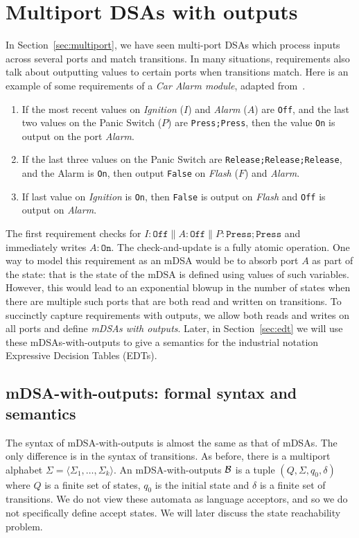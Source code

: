 \section{Multiport DSAs with outputs}
\label{sec:multiport-outputs}

In Section~\ref{sec:multiport}, we have seen multi-port DSAs which process inputs across several ports and match transitions. In many situations, requirements also talk about outputting values to certain ports when transitions match. Here is an example of some requirements of a \emph{Car Alarm module}, adapted from~\cite{DBLP:conf/enase/VenkateshSZA15a}. 
\begin{enumerate}
\item If the most recent values on \emph{Ignition} ($I$) and \emph{Alarm} ($A$) are \texttt{Off}, and the last two values on the Panic Switch ($P$) are \texttt{Press;Press}, then the value \texttt{On} is output on the port \emph{Alarm}.

\item If the last three values on the Panic Switch are \texttt{Release;Release;Release}, and the Alarm is \texttt{On}, then output \texttt{False} on \emph{Flash} ($F$)
and \emph{Alarm}.

\item If last value on \emph{Ignition} is \texttt{On}, then \texttt{False} is output on \emph{Flash} and \texttt{Off} is output on \emph{Alarm}.
\end{enumerate}

The first requirement checks for $I:\mathtt{Off} \parallel A:\mathtt{Off} \parallel P:\mathtt{Press;Press}$ and immediately writes $A: \mathtt{On}$. The check-and-update is a fully atomic operation. One way to model this requirement as an mDSA would be to absorb port $A$ as part of the state: that is the state of the mDSA is defined using values of such variables. However, this would lead to an exponential blowup in the number of states when there are multiple such ports that are both read and written on transitions. To succinctly capture requirements with outputs, we allow both reads and writes on all ports and define \emph{mDSAs with outputs}. Later, in Section~\ref{sec:edt} we will use these mDSAs-with-outputs to give a semantics for the industrial notation Expressive Decision Tables (EDTs).

\subsection{mDSA-with-outputs: formal syntax and semantics}
\label{sec:mdsao-synt}
The syntax of mDSA-with-outputs is almost the same as that of mDSAs. The only difference is in the syntax of transitions.  As before, there is a multiport alphabet $\Sigma = \langle \Sigma_1, \dots, \Sigma_k \rangle$. An mDSA-with-outputs $\mathcal{B}$ is a tuple $(Q, \Sigma, q_0, \delta)$ where $Q$ is a finite set of states, $q_0$ is the initial state and $\delta$ is a finite set of transitions. We do not view these automata as language acceptors, and so we do not specifically define accept states. We will later discuss the state reachability problem. 

